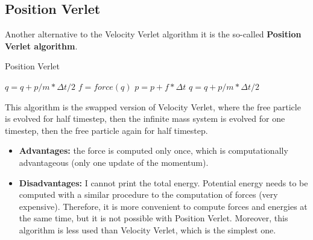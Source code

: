 \subsection{Position Verlet}
Another alternative to the Velocity Verlet algorithm it is the so-called \textbf{Position Verlet algorithm}.
\begin{algorithm}[H]
			\caption{Position Verlet}
			\label{alg:position_verlet}
			\begin{algorithmic}[1]
			\State	$q=q+p/m* \Delta t/2$
			\State	$f=force(q)$
			\State	$p=p+f*\Delta t$
			\State	$q=q+p/m* \Delta t/2$
				\EndFor
			\end{algorithmic}
		\end{algorithm}
This algorithm is the swapped version of Velocity Verlet, where the free particle is evolved for half timestep, then the infinite mass system is evolved for one timestep, then the free particle again for half timestep. 
\begin{itemize}
    \item \textbf{Advantages:} the force is computed only once, which is computationally advantageous (only one update of the momentum).
    \item \textbf{Disadvantages:} I cannot print the total energy. Potential energy needs to be computed with a similar procedure to the computation of forces (very expensive). Therefore, it is more convenient to compute forces and energies at the same time, but it is not possible with Position Verlet. Moreover, this algorithm is less used than Velocity Verlet, which is the simplest one.
\end{itemize}

